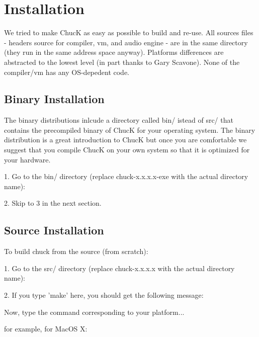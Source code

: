 \chapter{Installation}

We tried to make ChucK as easy as possible to build and re-use. All 
sources files - headers source for compiler, vm, and audio engine - are 
in the same directory (they run in the same address space anyway). Platforms 
differences are abstracted to the lowest level (in part thanks to Gary 
Scavone). None of the compiler/vm has any OS-depedent code. 

\section{Binary Installation}

The binary distributions inlcude a directory called bin/ istead of src/ that contains the precompiled binary of ChucK for your operating system. The binary distribution is a great introduction to ChucK but once you are comfortable we suggest that you compile ChucK on your own system so that it is optimized for your hardware. 

1. Go to the bin/ directory (replace chuck-x.x.x.x-exe with the actual 
directory name):


2. Skip to 3 in the next section.


\section{Source Installation}

To build chuck from the source (from scratch): 

1. Go to the src/ directory (replace chuck-x.x.x.x with the actual 
directory name):



2. If you type 'make' here, you should get the following message:


Now, type the command corresponding to your platform... 

for example, for MacOS X:

